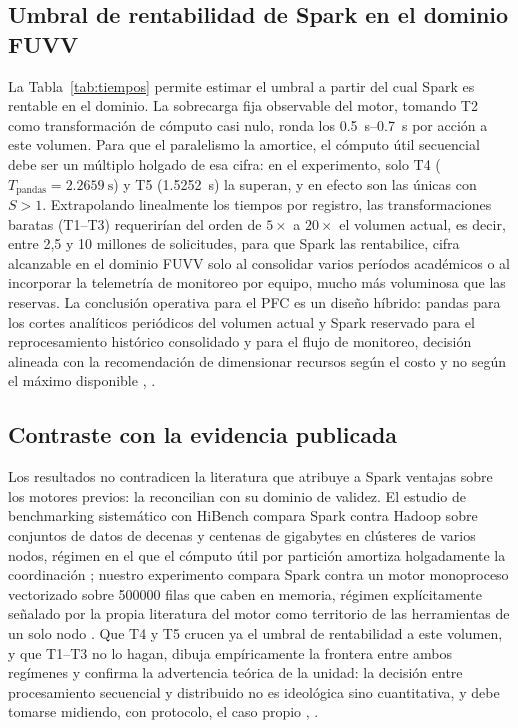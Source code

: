 \documentclass[10pt,journal]{IEEEtran}
\begin{document}
\subsection{Umbral de rentabilidad de Spark en el dominio FUVV}
La Tabla~\ref{tab:tiempos} permite estimar el umbral a partir del cual Spark es
rentable en el dominio. La sobrecarga fija observable del motor, tomando T2
como transformaci\'on de c\'omputo casi nulo, ronda los
\SI{0.5}{\second}--\SI{0.7}{\second} por acci\'on a este volumen. Para que el
paralelismo la amortice, el c\'omputo \'util secuencial debe ser un m\'ultiplo
holgado de esa cifra: en el experimento, solo T4
($T_{\text{pandas}} = \SI{2.2659}{\second}$) y T5
(\SI{1.5252}{\second}) la superan, y en efecto son las \'unicas con
$S > 1$. Extrapolando linealmente los tiempos por registro, las
transformaciones baratas (T1--T3) requerir\'ian del orden de $5\times$ a
$20\times$ el volumen actual, es decir, entre 2,5 y 10 millones de solicitudes,
para que Spark las rentabilice, cifra alcanzable en el dominio FUVV solo al
consolidar varios per\'iodos acad\'emicos o al incorporar la telemetr\'ia de
monitoreo por equipo, mucho m\'as voluminosa que las reservas. La conclusi\'on
operativa para el PFC es un dise\~no h\'ibrido: pandas para los cortes
anal\'iticos peri\'odicos del volumen actual y Spark reservado para el
reprocesamiento hist\'orico consolidado y para el flujo de monitoreo, decisi\'on
alineada con la recomendaci\'on de dimensionar recursos seg\'un el costo y no
seg\'un el m\'aximo disponible \cite{asemanmanzar2023}, \cite{ahmed2020}.

\subsection{Contraste con la evidencia publicada}
Los resultados no contradicen la literatura que atribuye a Spark ventajas
sobre los motores previos: la reconcilian con su dominio de validez. El
estudio de benchmarking sistem\'atico con HiBench compara Spark contra Hadoop
sobre conjuntos de datos de decenas y centenas de gigabytes en cl\'usteres de
varios nodos, r\'egimen en el que el c\'omputo \'util por partici\'on amortiza
holgadamente la coordinaci\'on \cite{ahmed2020}; nuestro experimento compara
Spark contra un motor monoproceso vectorizado sobre \num{500000} filas que
caben en memoria, r\'egimen expl\'icitamente se\~nalado por la propia
literatura del motor como territorio de las herramientas de un solo nodo
\cite{zaharia2016}. Que T4 y T5 crucen ya el umbral de rentabilidad a este
volumen, y que T1--T3 no lo hagan, dibuja emp\'iricamente la frontera entre
ambos reg\'imenes y confirma la advertencia te\'orica de la unidad: la
decisi\'on entre procesamiento secuencial y distribuido no es ideol\'ogica
sino cuantitativa, y debe tomarse midiendo, con protocolo, el caso propio
\cite{amdahl1967}, \cite{karp1990}.
\end{document}
